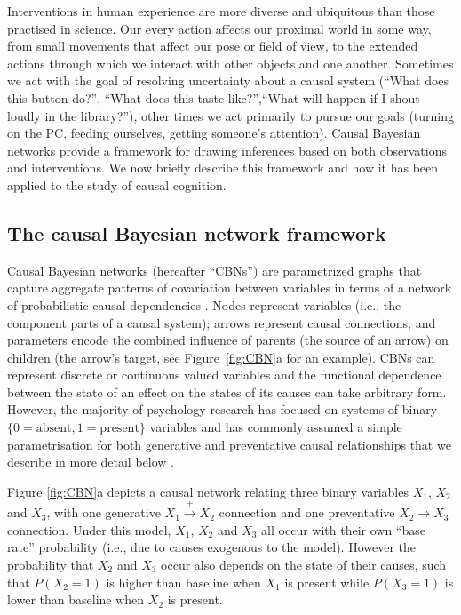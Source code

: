 \documentclass{cambridge7A}%
\begin{document}
Interventions in human experience are more diverse and ubiquitous than those practised in science.  Our every action affects our proximal world in some way, from small movements that affect our pose or field of view, to the extended actions through which we interact with other objects and one another.  Sometimes we act with the goal of resolving uncertainty about a causal system (``What does this button do?'', ``What does this taste like?'',``What will happen if I shout loudly in the library?''), other times we act primarily to pursue our goals (turning on the PC, feeding ourselves, getting someone's attention).  Causal Bayesian networks \citep{pearl2000causality} provide a framework for drawing inferences based on both observations and interventions. 
We now briefly describe this framework and how it has been applied to the study of causal cognition.


\subsection{The causal Bayesian network framework}

Causal Bayesian networks (hereafter ``CBNs'')  are parametrized graphs that capture aggregate patterns of covariation between variables in terms of  a network of probabilistic causal dependencies \citep{pearl2000causality}. 
Nodes represent variables (i.e., the component parts of a causal system); arrows represent causal connections; and parameters encode the combined influence of parents (the source of an arrow) on children (the arrow's target, see Figure~\ref{fig:CBN}a for an example).  CBNs can represent discrete or continuous valued variables and the functional dependence between the state of an effect on the states of its causes can take arbitrary form.  However, the majority of psychology research has focused on  systems of binary $\{0=\mathrm{absent},1=\mathrm{present}\}$ variables and has commonly assumed a simple parametrisation for both generative and preventative causal relationships that we describe in more detail below \citep{cheng1997from}.

Figure \ref{fig:CBN}a depicts a causal network relating three binary variables $X_1$, $X_2$ and $X_3$, with one generative $X_1\!\stackrel{+}\rightarrow\!X_2$ connection and one preventative $X_2\!\stackrel{-}\rightarrow\!X_3$ connection.  Under this model, $X_1$, $X_2$ and $X_3$ all occur with their own ``base rate'' probability (i.e., due to causes exogenous to the model).  However the probability that $X_2$ and $X_3$ occur also depends on the state of their causes, such that  $P(X_2=1)$ is higher than baseline when $X_1$ is present while $P(X_3=1)$ is lower than baseline when $X_2$ is present.
\end{document}
